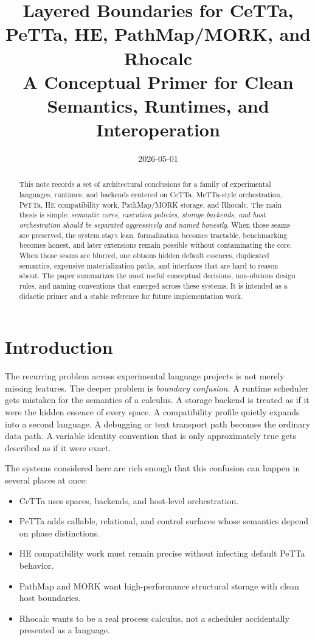 \documentclass[11pt]{article}
\title{Layered Boundaries for CeTTa, PeTTa, HE, PathMap/MORK, and Rhocalc\\
\large A Conceptual Primer for Clean Semantics, Runtimes, and Interoperation}
\author{}
\date{2026-05-01}
\begin{document}
\maketitle

\begin{abstract}
This note records a set of architectural conclusions for a family of experimental languages, runtimes, and backends centered on CeTTa, MeTTa-style orchestration, PeTTa, HE compatibility work, PathMap/MORK storage, and Rhocalc. The main thesis is simple: \emph{semantic cores, execution policies, storage backends, and host orchestration should be separated aggressively and named honestly}. When those seams are preserved, the system stays lean, formalization becomes tractable, benchmarking becomes honest, and later extensions remain possible without contaminating the core. When those seams are blurred, one obtains hidden default essences, duplicated semantics, expensive materialization paths, and interfaces that are hard to reason about. The paper summarizes the most useful conceptual decisions, non-obvious design rules, and naming conventions that emerged across these systems. It is intended as a didactic primer and a stable reference for future implementation work.
\end{abstract}

\section{Introduction}

The recurring problem across experimental language projects is not merely missing features. The deeper problem is \emph{boundary confusion}. A runtime scheduler gets mistaken for the semantics of a calculus. A storage backend is treated as if it were the hidden essence of every space. A compatibility profile quietly expands into a second language. A debugging or text transport path becomes the ordinary data path. A variable identity convention that is only approximately true gets described as if it were exact.

The systems considered here are rich enough that this confusion can happen in several places at once:

\begin{itemize}
  \item CeTTa uses spaces, backends, and host-level orchestration.
  \item PeTTa adds callable, relational, and control surfaces whose semantics depend on phase distinctions.
  \item HE compatibility work must remain precise without infecting default PeTTa behavior.
  \item PathMap and MORK want high-performance structural storage with clean host boundaries.
  \item Rhocalc wants to be a real process calculus, not a scheduler accidentally presented as a language.
\end{itemize}
\end{document}
